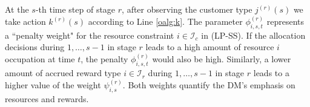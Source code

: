 \documentclass[letterpaper, 10 pt, conference]{ieeeconf}  %
\newcommand{\III}{\mathcal{I}}
\newcommand{\KKK}{\mathcal{K}}
\theoremstyle{plain}
\theoremstyle{definition}
\theoremstyle{remark}
\begin{document}
At the $s$-th time step of stage $r$, after observing the customer type $j^{(r)}(s)$ we take action $k^{(r)}(s)$ according to Line \ref{oalg:k}. The parameter
$\phi^{(r)}_{i,s,t}$ represents a ``penalty weight" for the resource constraint $i\in \III_c$ in (LP-SS). If the allocation decisions during  $1, \ldots, s-1$ in stage $r$ leads to a high amount of resource $i$ occupation at time $t$, the penalty $\phi^{(r)}_{i,s,t}$ would also be high. Similarly, a lower amount of accrued reward type $i \in \III_r$ during $1, \ldots, s-1$ in stage $r$ leads to a higher value of the weight $\psi^{(r)}_{i, s}$. Both weights quantify the DM's emphasis on resources and rewards. 
\iffalse
In Line \ref{oalg:weight}, we set
\begin{equation}
\resizebox{1\hsize}{!}{
$\phi^{(r)}_{i,s+1,t}=
\begin{cases}
\frac{\epsilon \gamma}{c_i \left(1+\epsilon\right)^{\gamma-\delta}} \left[\left(1+\epsilon\right)^{\frac{\gamma}{c_i} \sum^{s}_{\tau=1} Y^{(r)}_{i \tau t}}\right],  ~t=s+1 \\
\frac{\epsilon \gamma}{c_i \left(1+\epsilon\right)^{\gamma-\delta}} \left[\left(1+\epsilon\right)^{\frac{\gamma}{c_i} \sum^{s}_{\tau=1} Y^{(r)}_{i \tau t}} \right. \\
\quad \quad \quad \quad ~\left. \prod^{t}_{\tau=s+2} \left(1+\epsilon \frac{\gamma \Pr\left(D_i \geq t-\tau+1\right)}{d_i \left(1+\epsilon\right)}\right)\right],  \\
\quad \quad \quad \quad \quad \quad \quad \quad \quad \quad \quad \quad t=s+2,\ldots,t^{(r)} \nonumber
\end{cases}$
}
\end{equation}
\begin{equation}
\resizebox{1\hsize}{!}{
$\begin{aligned}
\psi^{(r)}_{i,s+1} = &  - \frac{\epsilon^{(r)}_{z}}{w_{\max}  \left(1-\epsilon^{(r)}_{z}\right)^{\frac{\left(1-\epsilon^{(r)}_{z}\right) t^{(r)} \lambda^{(r)}}{w_{\max}}}} \cdot \nonumber \\
& \left[\left(1-\epsilon^{(r)}_{z}\right)^{\frac{1}{w_{\max}} \sum^{s}_{\tau=1} Z^{(r)}_{i \tau}} \prod^{t^{(r)}}_{\tau=s+2} \left(1-\epsilon^{(r)}_{z} \frac{\lambda^{(r)}}{w_{\max} \left(1+\epsilon\right)}\right)\right].  \nonumber
\end{aligned}$
}
\end{equation}
\fi
\end{document}
